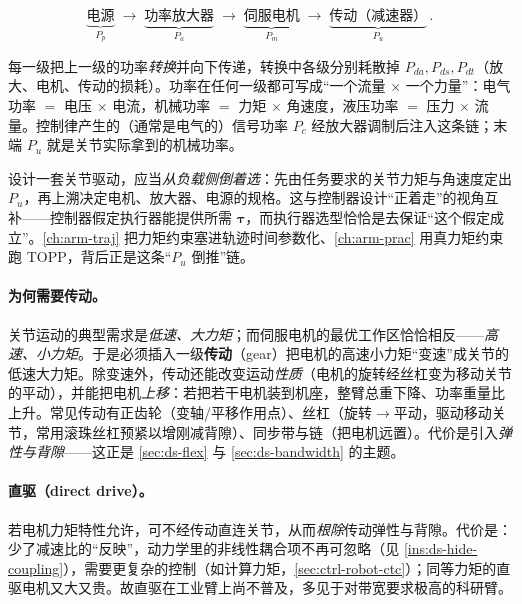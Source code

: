 \begin{equation}
\underbrace{\text{电源}}_{P_p}\;\longrightarrow\;\underbrace{\text{功率放大器}}_{P_a}\;\longrightarrow\;\underbrace{\text{伺服电机}}_{P_m}\;\longrightarrow\;\underbrace{\text{传动（减速器）}}_{P_u}\,.
\label{eq:ds-powerflow}
\end{equation}

每一级把上一级的功率\emph{转换}并向下传递，转换中各级分别耗散掉 $P_{da},P_{ds},P_{dt}$（放大、电机、传动的损耗）。功率在任何一级都可写成“一个流量 $\times$ 一个力量”：电气功率 $=$ 电压 $\times$ 电流，机械功率 $=$ 力矩 $\times$ 角速度，液压功率 $=$ 压力 $\times$ 流量。控制律产生的（通常是电气的）信号功率 $P_c$ 经放大器调制后注入这条链；末端 $P_u$ 就是关节实际拿到的机械功率。

\begin{insight}
\label{ins:ds-power-backward}
设计一套关节驱动，应当\emph{从负载侧倒着选}：先由任务要求的关节力矩与角速度定出 $P_u$，再上溯决定电机、放大器、电源的规格。这与控制器设计“正着走”的视角互补——控制器假定执行器能提供所需 $\boldsymbol{\tau}$，而执行器选型恰恰是去保证“这个假定成立”。\cref{ch:arm-traj} 把力矩约束塞进轨迹时间参数化、\cref{ch:arm-prac} 用真力矩约束跑 TOPP，背后正是这条“$P_u$ 倒推”链。
\end{insight}

\paragraph{为何需要传动。}\;关节运动的典型需求是\emph{低速、大力矩}；而伺服电机的最优工作区恰恰相反——\emph{高速、小力矩}。于是必须插入一级\textbf{传动}（gear）把电机的高速小力矩“变速”成关节的低速大力矩。除变速外，传动还能改变运动\emph{性质}（电机的旋转经丝杠变为移动关节的平动），并能把电机\emph{上移}：若把若干电机装到机座，整臂总重下降、功率重量比上升。常见传动有正齿轮（变轴/平移作用点）、丝杠（旋转$\to$平动，驱动移动关节，常用滚珠丝杠预紧以增刚减背隙）、同步带与链（把电机远置）。代价是引入\emph{弹性与背隙}——这正是 \cref{sec:ds-flex} 与 \cref{sec:ds-bandwidth} 的主题。

\paragraph{直驱（direct drive）。}\;若电机力矩特性允许，可不经传动直连关节，从而\emph{根除}传动弹性与背隙。代价是：少了减速比的“反映”，动力学里的非线性耦合项不再可忽略（见 \cref{ins:ds-hide-coupling}），需要更复杂的控制（如计算力矩，\cref{sec:ctrl-robot-ctc}）；同等力矩的直驱电机又大又贵。故直驱在工业臂上尚不普及，多见于对带宽要求极高的科研臂。

